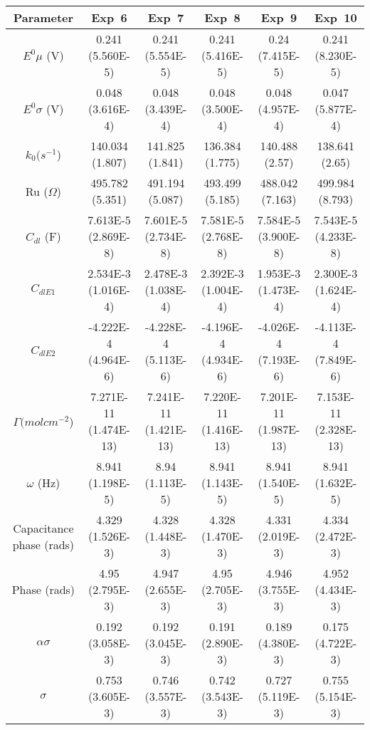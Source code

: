 \documentclass[preview]{standalone}
\begin{document}
\begin{center}
\begin{tabular}{|c|c|c|c|c|c|}
\hline
Parameter & Exp\ 6 & Exp\ 7 & Exp\ 8 & Exp\ 9 & Exp\ 10\\
\hline\hline
$E^0 \mu$ (V) & 0.241 (5.560E-5) & 0.241 (5.554E-5) & 0.241 (5.416E-5) & 0.24 (7.415E-5) & 0.241 (8.230E-5) \\
\hline
$E^0 \sigma$ (V) & 0.048 (3.616E-4) & 0.048 (3.439E-4) & 0.048 (3.500E-4) & 0.048 (4.957E-4) & 0.047 (5.877E-4) \\
\hline
$k_0 (s^{-1}$) & 140.034 (1.807) & 141.825 (1.841) & 136.384 (1.775) & 140.488 (2.57) & 138.641 (2.65) \\
\hline
Ru ($\Omega$) & 495.782 (5.351) & 491.194 (5.087) & 493.499 (5.185) & 488.042 (7.163) & 499.984 (8.793) \\
\hline
$C_{dl}$ (F) & 7.613E-5 (2.869E-8) & 7.601E-5 (2.734E-8) & 7.581E-5 (2.768E-8) & 7.584E-5 (3.900E-8) & 7.543E-5 (4.233E-8) \\
\hline
$C_{dlE1}$& 2.534E-3 (1.016E-4) & 2.478E-3 (1.038E-4) & 2.392E-3 (1.004E-4) & 1.953E-3 (1.473E-4) & 2.300E-3 (1.624E-4) \\
\hline
$C_{dlE2}$& -4.222E-4 (4.964E-6) & -4.228E-4 (5.113E-6) & -4.196E-4 (4.934E-6) & -4.026E-4 (7.193E-6) & -4.113E-4 (7.849E-6) \\
\hline
$\Gamma (mol cm^{-2}$) & 7.271E-11 (1.474E-13) & 7.241E-11 (1.421E-13) & 7.220E-11 (1.416E-13) & 7.201E-11 (1.987E-13) & 7.153E-11 (2.328E-13) \\
\hline
$\omega$ (Hz) & 8.941 (1.198E-5) & 8.94 (1.113E-5) & 8.941 (1.143E-5) & 8.941 (1.540E-5) & 8.941 (1.632E-5) \\
\hline
Capacitance phase (rads) & 4.329 (1.526E-3) & 4.328 (1.448E-3) & 4.328 (1.470E-3) & 4.331 (2.019E-3) & 4.334 (2.472E-3) \\
\hline
Phase (rads) & 4.95 (2.795E-3) & 4.947 (2.655E-3) & 4.95 (2.705E-3) & 4.946 (3.755E-3) & 4.952 (4.434E-3) \\
\hline
$\alpha\sigma$& 0.192 (3.058E-3) & 0.192 (3.045E-3) & 0.191 (2.890E-3) & 0.189 (4.380E-3) & 0.175 (4.722E-3) \\
\hline
$\sigma$& 0.753 (3.605E-3) & 0.746 (3.557E-3) & 0.742 (3.543E-3) & 0.727 (5.119E-3) & 0.755 (5.154E-3) \\
\hline
\end{tabular}
\end{center}
\end{document}
